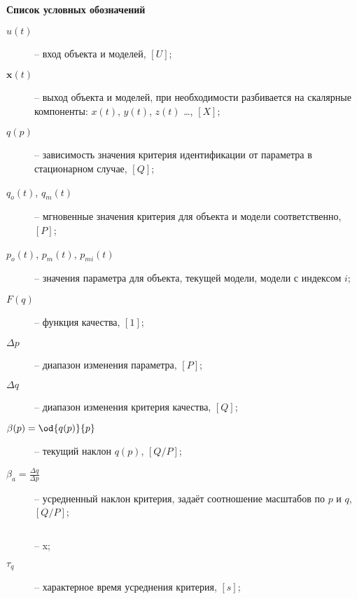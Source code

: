 \clearpage
{}

\begin{center}
  \textbf{Список условных обозначений}
\end{center}


\begin{description}

  \item[$u(t)$]  -- вход объекта и моделей, $[U]$;

  \item[$\mathbf{x}(t)$]  -- выход объекта и моделей, при необходимости разбивается на скалярные компоненты:
     $x(t)$, $y(t)$, $z(t)$ \ldots, $[X]$;

  \item[$q(p)$]  -- зависимость значения критерия идентификации от параметра в стационарном случае, $[Q]$;

  \item[$q_o(t)$, $q_m(t)$]  -- мгновенные значения критерия для объекта и модели соответственно, $[P]$;

  \item[$p_o(t)$, $p_m(t)$, $p_{mi}(t)$]  -- значения параметра для объекта, текущей модели, модели с индексом $i$;

  \item[$F(q) $]  -- функция качества, $[1]$;

  \item[$\Delta p$]  -- диапазон изменения параметра, $[P]$;

  \item[$\Delta q$]  -- диапазон изменения критерия качества, $[Q]$;

  \item[$\beta(p) = \od{q(p)}{p}$]  -- текущий наклон $q(p)$, $[Q/P]$;

  \item[$\beta_a = \frac{\Delta q}{\Delta p} $]  -- усредненный наклон критерия, задаёт соотношение масштабов по $p$ и $q$, $[Q/P]$;

  \item[$ $]  -- x;

  \item[$\tau_q$]  -- характерное время усреднения критерия, $[s]$;


\end{description}

